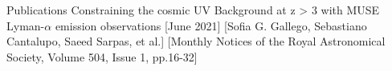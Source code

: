\begin{cvsection}{Publications}
    \cvitem
    {Constraining the cosmic UV Background at z > 3 with MUSE Lyman-$\alpha$ emission observations}
    [June 2021]
    [Sofia G. Gallego, Sebastiano Cantalupo, Saeed Sarpas, et al.]
    [Monthly Notices of the Royal Astronomical Society, Volume 504, Issue 1, pp.16-32]
\end{cvsection}